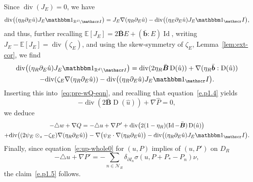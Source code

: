 \documentclass[JEP,XML,SOM,Unicode,published]{cedram}
\let\mathcal\mathscr
\let\mathds\mathbbm
\theoremstyle{plain}
\theoremstyle{definition}
\newcommand{\R}{\mathbb R}
\newcommand{\Ic}{\mathcal I}
\newcommand{\Nc}{\mathcal N}
\newcommand{\Id}{\operatorname{Id}}
\newcommand{\D}{\operatorname{D}}
\newcommand{\bb}{\bar{\boldsymbol b}}
\newcommand{\Bb}{\bar{\boldsymbol B}}
\newcommand{\Div}{{\operatorname{div}}}
\newcommand{\expec}[1]{\mathbb{E}\left[ #1 \right]}
\begin{document}
Since $\Div(J_E)=0$, we have
\[\Div\big((\eta_R\partial_E\hat u)J_E\mathds1_{\R^d\setminus\Ic}\big)=J_E\nabla(\eta_R\partial_E\hat u)-\Div\big((\eta_E\partial_E\hat u)J_E\mathds1_\Ic\big),\]
and thus, further recalling $\expec{J_E}=2\Bb E+(\bb:E)\Id$, writing $J_E-\expec{J_E}=\Div(\zeta_E)$, and using the skew-symmetry of $\zeta_E$, \cf Lemma~\ref{lem:ext-cor}, we find
\begin{multline*}
\Div\big((\eta_R\partial_E\hat u)J_E\mathds1_{\R^d\setminus\Ic}\big)=\Div(2\eta_R\Bb\D(\hat u))+\nabla(\eta_R\bb:\D(\hat u))\\
-\Div(\zeta_E\nabla(\eta_R\partial_E\hat u))-\Div\big((\eta_R\partial_E\hat u)J_E\mathds1_\Ic\big).
\end{multline*}
Inserting this into~\eqref{eq:pre-wQ-eqn}, and recalling that equation~\eqref{e.p1.4} yields
\[
-\Div(2\Bb\D(\hat u))+\nabla\hat P=0,
\]
we deduce
\begin{multline*}
-\triangle w+\nabla Q=-\triangle u+\nabla P'+\Div\big(2(1-\eta_R)(\Id-\Bb)\D(\hat u)\big)\\
+\Div\big((2\psi_E\otimes_s-\zeta_E)\nabla(\eta_R\partial_E\hat u)\big)-\nabla\big(\psi_{E}\cdot\nabla(\eta_R\partial_E\hat u)\big)
-\Div\big((\eta_R\partial_E\hat u)J_E\mathds1_\Ic\big).
\end{multline*}
Finally, since equation~\eqref{e:up-whole0} for $(u,P)$ implies of $(u,P')$ on $D_R$
\[-\triangle u+\nabla P'=-\sum_{n\in\Nc_R}\delta_{\partial I_n}\sigma(u,P+P_*-P_n)\nu,\]
the claim~\eqref{e.p1.5} follows.
\end{document}

